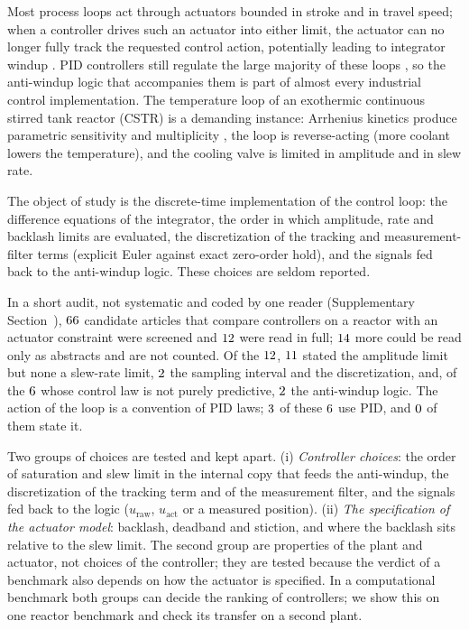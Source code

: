 Most process loops act through actuators bounded in stroke and in travel speed; when a controller drives such an actuator into either limit, the actuator can no longer fully track the requested control action, potentially leading to integrator windup \cite{astrom1989windup, hippe2006windup, galeani2009tutorial, tarbouriech2009antiwindup}. PID controllers still regulate the large majority of these loops \cite{astrom2006pid, seborg2010process}, so the anti-windup logic that accompanies them is part of almost every industrial control implementation. The temperature loop of an exothermic continuous stirred tank reactor (CSTR) is a demanding instance: Arrhenius kinetics produce parametric sensitivity and multiplicity \cite{uppal1974dynamic, aris1958analysis, bequette2003process}, the loop is reverse-acting (more coolant lowers the temperature), and the cooling valve is limited in amplitude and in slew rate.

The object of study is the discrete-time implementation of the control loop: the difference equations of the integrator, the order in which amplitude, rate and backlash limits are evaluated, the discretization of the tracking and measurement-filter terms (explicit Euler against exact zero-order hold), and the signals fed back to the anti-windup logic. These choices are seldom reported.

In a short audit, not systematic and coded by one reader (Supplementary Section~), $66$ candidate articles that compare controllers on a reactor with an actuator constraint were screened and $12$ were read in full; $14$ more could be read only as abstracts and are not counted. Of the $12$, $11$ stated the amplitude limit but none a slew-rate limit, $2$ the sampling interval and the discretization, and, of the $6$ whose control law is not purely predictive, $2$ the anti-windup logic. The action of the loop is a convention of PID laws; $3$ of these $6$ use PID, and $0$ of them state it.

Two groups of choices are tested and kept apart. (i) \emph{Controller choices}: the order of saturation and slew limit in the internal copy that feeds the anti-windup, the discretization of the tracking term and of the measurement filter, and the signals fed back to the logic ($u_{\text{raw}}$, $u_{\text{act}}$ or a measured position). (ii) \emph{The specification of the actuator model}: backlash, deadband and stiction, and where the backlash sits relative to the slew limit. The second group are properties of the plant and actuator, not choices of the controller; they are tested because the verdict of a benchmark also depends on how the actuator is specified. In a computational benchmark both groups can decide the ranking of controllers; we show this on one reactor benchmark and check its transfer on a second plant.

